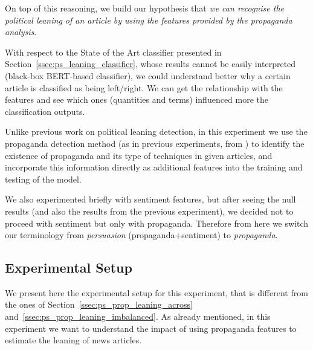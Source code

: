 On top of this reasoning, we build our hypothesis that \emph{we can recognise the political leaning of an article by using the features provided by the propaganda analysis}.

With respect to the State of the Art classifier presented in Section~\ref{ssec:ps_leaning_classifier}, whose results cannot be easily interpreted (black-box BERT-based classifier),
we could understand better why a certain article is classified as being left/right. We can get the relationship with the features and see which ones (quantities and terms) influenced more the classification outputs.



Unlike previous work on political leaning detection, in this experiment we use the propaganda detection method (as in previous experiments, from \citet{da2019fine}) to identify the existence of propaganda and its type of techniques in given articles, and incorporate this information directly as additional features into the training and testing of the model.

We also experimented briefly with sentiment features, but after seeing the null results (and also the results from the previous experiment), we decided not to proceed with sentiment but only with propaganda.
Therefore from here we switch our terminology from \emph{persuasion} (propaganda+sentiment) to \emph{propaganda}.




\subsection{Experimental Setup}
\label{ssec:ps_prop_leaning_classifier_setup}

We present here the experimental setup for this experiment, that is different from the ones of Section~\ref{ssec:ps_prop_leaning_across} and~\ref{ssec:ps_prop_leaning_imbalanced}.
As already mentioned, in this experiment we want to understand the impact of using propaganda features to estimate the leaning of news articles.


